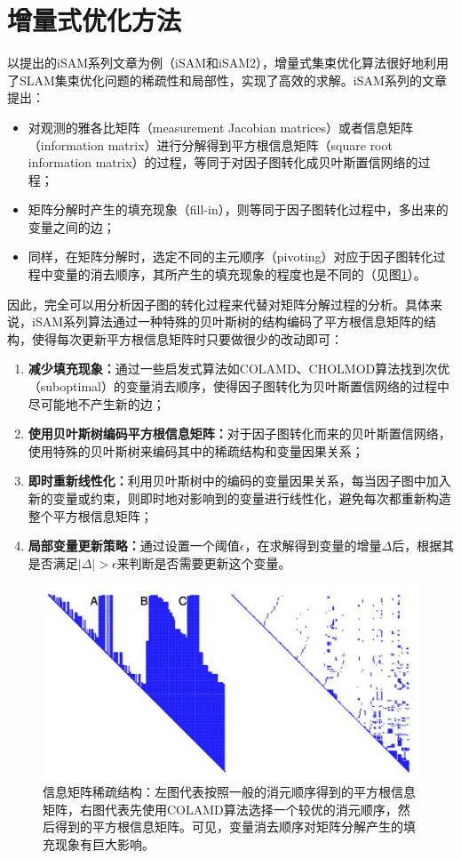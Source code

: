 \section{增量式优化方法}

以\citeauthor{kaess2008isam}提出的iSAM系列文章为例（iSAM\citep{kaess2008isam}和iSAM2\citep{kaess2012isam2}），增量式集束优化算法很好地利用了SLAM集束优化问题的稀疏性和局部性，实现了高效的求解。iSAM系列的文章提出：
\begin{itemize}
    \item 对观测的雅各比矩阵（measurement Jacobian matrices）或者信息矩阵（information matrix）进行分解得到平方根信息矩阵（square root information matrix）的过程，等同于对因子图转化成贝叶斯置信网络的过程；
    \item 矩阵分解时产生的填充现象（fill-in），则等同于因子图转化过程中，多出来的变量之间的边；
    \item 同样，在矩阵分解时，选定不同的主元顺序（pivoting）对应于因子图转化过程中变量的消去顺序，其所产生的填充现象的程度也是不同的（见图\ref{fig:fill_in}）。
\end{itemize}

因此，完全可以用分析因子图的转化过程来代替对矩阵分解过程的分析。具体来说，iSAM系列算法通过一种特殊的贝叶斯树的结构编码了平方根信息矩阵的结构，使得每次更新平方根信息矩阵时只要做很少的改动即可：
\begin{enumerate}
    \item \textbf{减少填充现象：}通过一些启发式算法如COLAMD\citep{davis2004algorithm}、CHOLMOD\citep{chen2008algorithm}算法找到次优（suboptimal）的变量消去顺序，使得因子图转化为贝叶斯置信网络的过程中尽可能地不产生新的边；
    \item \textbf{使用贝叶斯树编码平方根信息矩阵：}对于因子图转化而来的贝叶斯置信网络，使用特殊的贝叶斯树来编码其中的稀疏结构和变量因果关系；
    \item \textbf{即时重新线性化：}利用贝叶斯树中的编码的变量因果关系，每当因子图中加入新的变量或约束，则即时地对影响到的变量进行线性化，避免每次都重新构造整个平方根信息矩阵；
    \item \textbf{局部变量更新策略：}通过设置一个阈值$\epsilon$，在求解得到变量的增量$\Delta$后，根据其是否满足$|\Delta|>\epsilon$来判断是否需要更新这个变量。
\end{enumerate}

\begin{figure}[htbp]
    \centering
    \includegraphics[width=.8\textwidth]{./figs/sparse_pattern.png}
    \caption{信息矩阵稀疏结构\citep{kaess2008isam}：左图代表按照一般的消元顺序得到的平方根信息矩阵，右图代表先使用COLAMD算法选择一个较优的消元顺序，然后得到的平方根信息矩阵。可见，变量消去顺序对矩阵分解产生的填充现象有巨大影响。}
    \label{fig:fill_in}
\end{figure}
